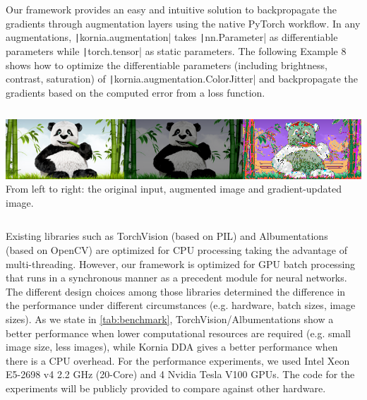 Our framework provides an easy and intuitive solution to backpropagate the gradients through augmentation layers using the native PyTorch workflow. In any augmentations, \texttt|kornia.augmentation| takes \texttt|nn.Parameter| as differentiable parameters while \texttt|torch.tensor| as static parameters. The following Example 8 shows how to optimize the differentiable parameters (including brightness, contrast, saturation) of \texttt|kornia.augmentation.ColorJitter| and backpropagate the gradients based on the computed error from a loss function.

\begin{tcolorbox}[every float=\centering, drop shadow, title=Example 8: Optimizable DA]
    \label{fig:examples:optimize}
    \inputminted[python3, baselinestretch=1., style=vs, fontfamily=courier, fontsize=\footnotesize, funcnamehighlighting=true]{python}{main/chapter03/data/dda/code/exp2_color_jitter_differentiable.py}
    \includegraphics[width=1.\linewidth]{main/chapter03/data/dda/imgs/exp2_demo.png}
    From left to right: the original input, augmented image and gradient-updated image.
    \inputminted[python3, baselinestretch=1., style=vs, fontfamily=courier, fontsize=\footnotesize, funcnamehighlighting=true]{python}{main/chapter03/data/dda/code/exp2_color_jitter_out.py}
\end{tcolorbox}

Existing libraries such as TorchVision (based on PIL) and Albumentations~\cite{info11020125} (based on OpenCV) are optimized for CPU processing taking the advantage of multi-threading. However, our framework is optimized for GPU batch processing that runs in a synchronous manner as a precedent module for neural networks. The different design choices among those libraries determined the difference in the performance under different circumstances (e.g. hardware, batch sizes, image sizes). As we state in \autoref{tab:benchmark}, TorchVision/Albumentations show a better performance when lower computational resources are required (e.g. small image size, less images), while Kornia DDA gives a better performance when there is a CPU overhead. For the performance experiments, we used Intel Xeon E5-2698 v4 2.2 GHz (20-Core) and 4 Nvidia Tesla V100 GPUs. The code for the experiments will be publicly provided to compare against other hardware.

